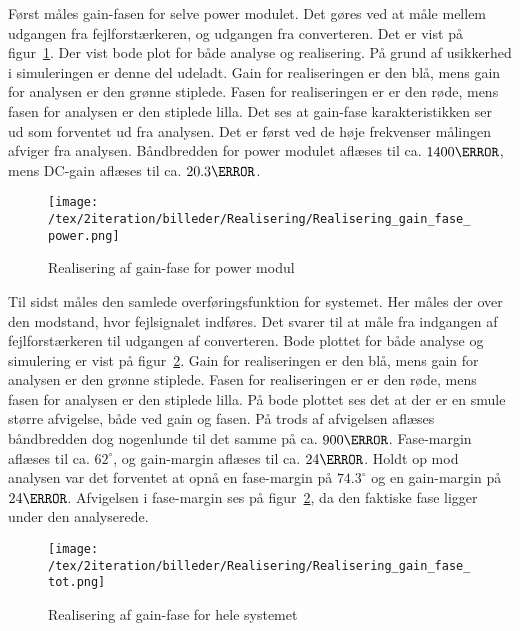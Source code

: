 Først måles gain-fasen for selve power modulet. Det gøres ved at måle mellem udgangen fra fejlforstærkeren, og udgangen fra converteren. Det er vist på figur~\ref{fig:realisering_gain_fase_power}. Der vist bode plot for både analyse og realisering. På grund af usikkerhed i simuleringen er denne del udeladt. Gain for realiseringen er den blå, mens gain for analysen er den grønne stiplede. Fasen for realiseringen er er den røde, mens fasen for analysen er den stiplede lilla. Det ses at gain-fase karakteristikken ser ud som forventet ud fra analysen. Det er først ved de høje frekvenser målingen afviger fra analysen. Båndbredden for power modulet aflæses til ca. $1400\hertz$, mens DC-gain aflæses til ca. $20.3\decibel$.

\begin{figure}[H]
	\center
	\texttt{[image: /tex/2iteration/billeder/Realisering/Realisering\_gain\_fase\_power.png]}
	\caption{Realisering af gain-fase for power modul}
	\label{fig:realisering_gain_fase_power}
\end{figure}



Til sidst måles den samlede overføringsfunktion for systemet. Her måles der over den modstand, hvor fejlsignalet indføres. Det svarer til at måle fra indgangen af fejlforstærkeren til udgangen af converteren. Bode plottet for både analyse og simulering er vist på figur~\ref{fig:realisering_gain_fase_tot}. Gain for realiseringen er den blå, mens gain for analysen er den grønne stiplede. Fasen for realiseringen er er den røde, mens fasen for analysen er den stiplede lilla. På bode plottet ses det at der er en smule større afvigelse, både ved gain og fasen. På trods af afvigelsen aflæses båndbredden dog nogenlunde til det samme på ca. $900\hertz$. Fase-margin aflæses til ca. $62^\circ$, og gain-margin aflæses til ca. $24\decibel$. Holdt op mod analysen var det forventet at opnå en fase-margin på $74.3^\circ$ og en gain-margin på $24\decibel$. Afvigelsen i fase-margin ses på figur~\ref{fig:realisering_gain_fase_tot}, da den faktiske fase ligger under den analyserede. 

\begin{figure}[H]
	\center
	\texttt{[image: /tex/2iteration/billeder/Realisering/Realisering\_gain\_fase\_tot.png]}
	\caption{Realisering af gain-fase for hele systemet}
	\label{fig:realisering_gain_fase_tot}
\end{figure}
















